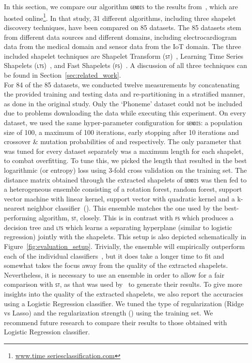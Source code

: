 \documentclass[runningheads]{llncs}
\begin{document}
In this section, we compare our algorithm \textsc{\texttt{gendis}} to the results from~\citep{bagnall2016great}, which are hosted online\footnote{ \url{www.time seriesclassification.com}}. In that study, 31 different algorithms, including three shapelet discovery techniques, have been compared on 85 datasets. The 85 datasets stem from different data sources and different domains, including electrocardiogram data from the medical domain and sensor data from the IoT domain. The three included shapelet techniques are Shapelet Transform (\textsc{\texttt{st}})~\citep{lines2012shapelet}, Learning Time Series Shapelets (\textsc{\texttt{lts}})~\citep{grabocka2014learning}, and Fast Shapelets (\textsc{\texttt{fs}})~\citep{rakthanmanon2013fast}. A discussion of all three techniques can be found in Section~\ref{sec:related_work}. \\

For 84 of the 85 datasets, we conducted twelve measurements by concatenating the provided training and testing data and re-partitioning in a stratified manner, as done in the original study. Only the `Phoneme' dataset could not be included due to problems downloading the data while executing this experiment. On every dataset, we used the same hyper-parameter configuration for \textsc{\texttt{gendis}}: a population size of 100, a maximum of 100 iterations, early stopping after 10 iterations and crossover \& mutation probabilities of  and  respectively. The only parameter that was tuned for every dataset separately was a maximum length for each shapelet, to combat overfitting. To tune this, we picked the length  that resulted in the best logarithmic (or entropy) loss using 3-fold cross validation on the training set. The distance matrix obtained through the extracted shapelets of \textsc{\texttt{gendis}} was then fed to a heterogeneous ensemble consisting of a rotation forest, random forest, support vector machine with linear kernel, support vector with quadratic kernel and a k-nearest neighbor classifier~(\cite{large2017heterogeneous}). This ensemble matches the one used by the best-performing algorithm, \textsc{\texttt{st}}, closely. This is in contrast with \textsc{\texttt{fs}} which produces a decision tree and \textsc{\texttt{lts}} which learns a separating hyperplane (similar to logistic regression) jointly with the shapelets. This setup is also depicted schematically in Figure~\ref{fig:evaluation_setup}. Trivially, the ensemble will empirically outperform each of the individual classifiers~\citep{dietterich2000ensemble}, but it does take a longer time to fit and somewhat takes the focus away from the quality of the extracted shapelets. Nevertheless, it is necessary to use an ensemble in order to allow for a fair comparison with \textsc{\texttt{st}}, as that was used by~\cite{bagnall2016great} to generate their results. To give more insights into the quality of the extracted shapelets, we also report the accuracies using a Logistic Regression classifier. We tuned the type of regularization (Ridge vs Lasso) and the regularization strength () using the training set. We recommend future research to compare their results to those obtained with Logistic Regression classifier.  \\
\end{document}
